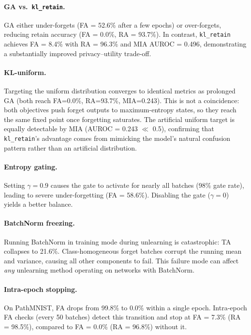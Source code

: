 \documentclass[10pt,twocolumn]{article}
\newcommand{\klr}{\texttt{kl\_retain}}
\begin{document}
\paragraph{GA vs.\ \klr{}.}
GA either under-forgets (FA = 52.6\% after a few epochs) or over-forgets, reducing retain accuracy (FA = 0.0\%, RA = 93.7\%).
In contrast, \klr{} achieves FA = 8.4\% with RA = 96.3\% and MIA AUROC = 0.496, demonstrating a substantially improved privacy--utility trade-off.

\paragraph{KL-uniform.}
Targeting the uniform distribution converges to identical metrics as prolonged GA (both reach FA=0.0\%, RA=93.7\%, MIA=0.243).
This is not a coincidence: both objectives push forget outputs to maximum-entropy states, so they reach the same fixed point once forgetting saturates.
The artificial uniform target is equally detectable by MIA (AUROC = 0.243 $\ll$ 0.5), confirming that \klr{}'s advantage comes from mimicking the model's natural confusion pattern rather than an artificial distribution.

\paragraph{Entropy gating.}
Setting $\gamma = 0.9$ causes the gate to activate for nearly all batches (98\% gate rate), leading to severe under-forgetting (FA = 58.6\%).
Disabling the gate ($\gamma = 0$) yields a better balance.

\paragraph{BatchNorm freezing.}
Running BatchNorm in training mode during unlearning is catastrophic: TA collapses to 21.6\%.
Class-homogeneous forget batches corrupt the running mean and variance, causing all other components to fail.
This failure mode can affect \emph{any} unlearning method operating on networks with BatchNorm.

\paragraph{Intra-epoch stopping.}
On PathMNIST, FA drops from 99.8\% to 0.0\% within a single epoch.
Intra-epoch FA checks (every 50 batches) detect this transition and stop at FA = 7.3\% (RA = 98.5\%), compared to FA = 0.0\% (RA = 96.8\%) without it.
\end{document}
